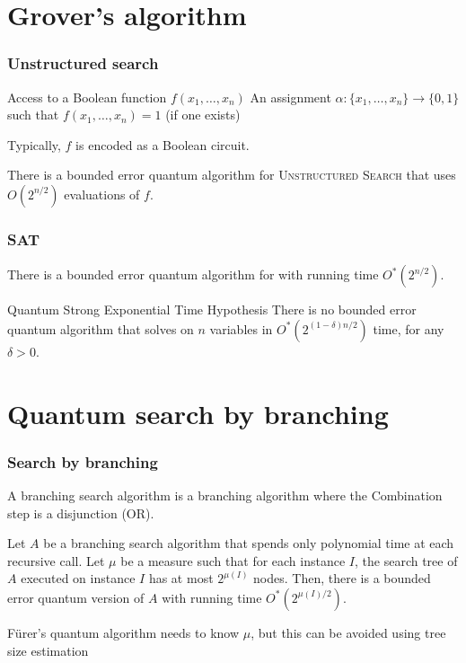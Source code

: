 	\section{Grover's algorithm}
	
	\begin{frame}
		\frametitle{Unstructured search}
		
		{Access to a Boolean function $f(x_1,\dots,x_n)$}
		{An assignment $\alpha : \{x_1,\dots,x_n\} \rightarrow \{0,1\}$ such that $f(x_1,\dots,x_n)=1$ (if one exists)}
		
		Typically, $f$ is encoded as a Boolean circuit.
		
		\begin{theorem}
			There is a bounded error quantum algorithm for \textsc{Unstructured Search} that uses $O(2^{n/2})$ evaluations of $f$.
		\end{theorem}
	\end{frame}
	
	\begin{frame}
		\frametitle{SAT}
		
		\begin{corollary}
			There is a bounded error quantum algorithm for \SAT with running time $O^*(2^{n/2})$.
		\end{corollary}
		
		\begin{block}{Quantum Strong Exponential Time Hypothesis \cite{BuhrmanPS21}}
			There is no bounded error quantum algorithm that solves \SAT on $n$ variables in $O^*(2^{(1-\delta)n/2})$ time, for any $\delta > 0$.
		\end{block}
	\end{frame}
	
	\section{Quantum search by branching}
	
	\begin{frame}
		\frametitle{Search by branching}
		
		\begin{definition}
			A \alert{branching search algorithm} is a branching algorithm where the Combination step is a disjunction (OR).
		\end{definition}
		
		\begin{theorem}
			Let $A$ be a branching search algorithm that spends only polynomial time at each recursive call.\newline
			Let $\mu$ be a measure such that for each instance $I$, the search tree of $A$ executed on instance $I$ has at most $2^{\mu(I)}$ nodes.\newline
			Then, there is a bounded error quantum version of $A$ with running time $O^*(2^{\mu(I)/2})$.
		\end{theorem}
		
		F{\"{u}}rer's quantum algorithm needs to know $\mu$, but this can be avoided using tree size estimation \cite{AmbainisK17}
	\end{frame}
	
